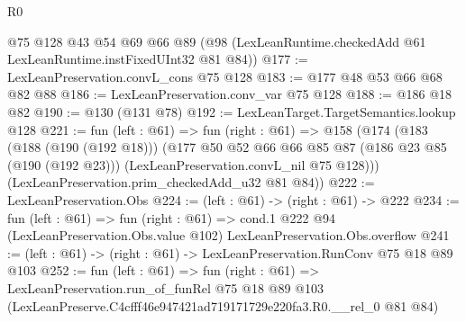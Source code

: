 \begin{lexlean}{R0}
\begin{coremodule}
    @75
    @128
    @43
    @54
    @69
    @66
    @89
    (@98 (LexLeanRuntime.checkedAdd @61 LexLeanRuntime.instFixedUInt32 @81 @84))
@177 := LexLeanPreservation.convL_cons @75 @128
@183 := @177 @48 @53 @66 @68 @82 @88
@186 := LexLeanPreservation.conv_var @75 @128
@188 := @186 @18 @82
@190 := @130 (@131 @78)
@192 := LexLeanTarget.TargetSemantics.lookup @128
@221 := fun (left : @61) =>
  fun (right : @61) =>
  @158
    (@174
      (@183
        (@188 (@190 (@192 @18)))
        (@177
          @50
          @52
          @66
          @66
          @85
          @87
          (@186 @23 @85 (@190 (@192 @23)))
          (LexLeanPreservation.convL_nil @75 @128)))
      (LexLeanPreservation.prim_checkedAdd_u32 @81 @84))
@222 := LexLeanPreservation.Obs
@224 := (left : @61) -> (right : @61) -> @222
@234 := fun (left : @61) =>
  fun (right : @61) =>
  cond.{1} @222 @94 (LexLeanPreservation.Obs.value @102) LexLeanPreservation.Obs.overflow
@241 := (left : @61) -> (right : @61) -> LexLeanPreservation.RunConv @75 @18 @89 @103
@252 := fun (left : @61) =>
  fun (right : @61) =>
  LexLeanPreservation.run_of_funRel
    @75
    @18
    @89
    @103
    (LexLeanPreserve.C4cfff46e947421ad719171729e220fa3.R0.__rel_0 @81 @84)
\end{coremodule}
\end{lexlean}
